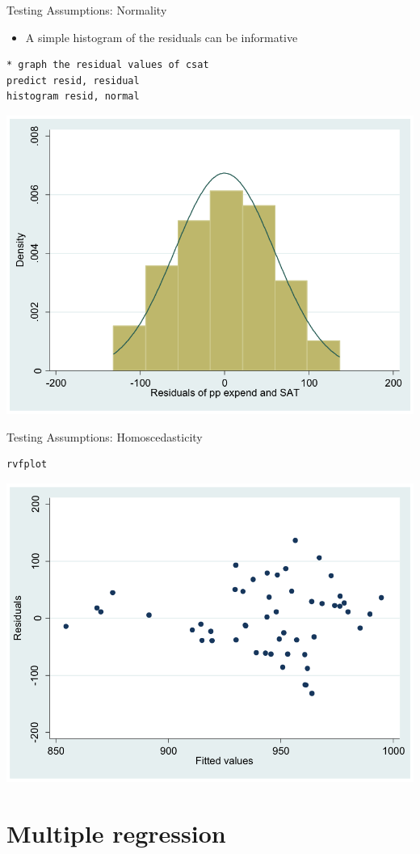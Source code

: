 \documentclass[table,smaller]{beamer}
\begin{document}
\begin{frame}[fragile,label=sec-2-8]{Testing Assumptions: Normality}
 \begin{itemize}
\item A simple histogram of the residuals can be informative
\end{itemize}

\begin{verbatim}
* graph the residual values of csat
predict resid, residual
histogram resid, normal
\end{verbatim}

\includegraphics[width=.6\textwidth]{images/normalHist1.png}
\end{frame}

\begin{frame}[fragile,label=sec-2-9]{Testing Assumptions: Homoscedasticity}
 \begin{verbatim}
rvfplot
\end{verbatim}


\includegraphics[width=.6\textwidth]{images/fittedResidual1.png}
\end{frame}


\section{Multiple regression}
\label{sec-3}
\end{document}
